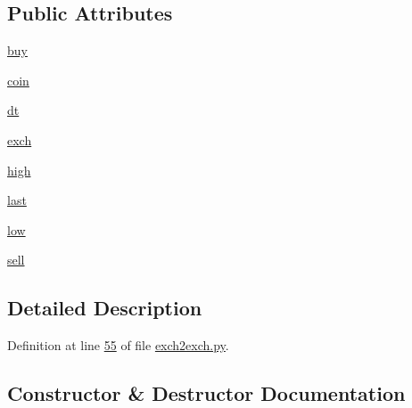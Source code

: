 \subsection*{Public Attributes}
\begin{DoxyCompactItemize}
\item 
\hyperlink{classexch2exch_1_1_xbt_prices_a8f1d8ac0ef114ea3645314578697b7ac}{buy}
\item 
\hyperlink{classexch2exch_1_1_xbt_prices_a1191c8825e8f1333b4100b89fa2be053}{coin}
\item 
\hyperlink{classexch2exch_1_1_xbt_prices_af9f916c683c48631c97f1c5d91447751}{dt}
\item 
\hyperlink{classexch2exch_1_1_xbt_prices_a72caf3a29017a1ceaf4367240a46b360}{exch}
\item 
\hyperlink{classexch2exch_1_1_xbt_prices_aeae6235417d65d9e9c768a51c38d5388}{high}
\item 
\hyperlink{classexch2exch_1_1_xbt_prices_a1da8993986574b27edcaf7259e78c899}{last}
\item 
\hyperlink{classexch2exch_1_1_xbt_prices_a8cef13f833a894d4fc5b8296bb4906fa}{low}
\item 
\hyperlink{classexch2exch_1_1_xbt_prices_a06fd0cfb03d485af3364a0d86fbe5385}{sell}
\end{DoxyCompactItemize}


\subsection{Detailed Description}


Definition at line \hyperlink{exch2exch_8py_source_l00055}{55} of file \hyperlink{exch2exch_8py_source}{exch2exch.\+py}.



\subsection{Constructor \& Destructor Documentation}
